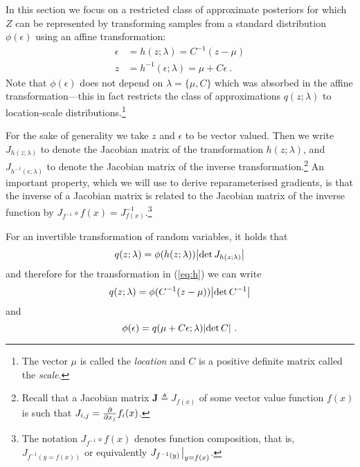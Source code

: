 \documentclass[a4paper,11pt]{article}
\begin{document}
In this section we focus on a restricted class of approximate posteriors for which $Z$ can be represented by transforming samples from a standard distribution $\phi(\epsilon)$ using an affine transformation:
\begin{subequations}\label{eq:h}
\begin{align}
\epsilon &= h(z; \lambda) = C^{-1} (z - \mu)  \\
z &= h^{-1}(\epsilon; \lambda) = \mu + C\epsilon ~ .
\end{align}
\end{subequations}
Note that $\phi(\epsilon)$ does not depend on $\lambda = \{\mu, C\}$ which was absorbed in the affine transformation---this in fact restricts the class of approximations $q(z; \lambda)$ to location-scale distributions.\footnote{The vector $\mu$ is called the \emph{location} and $C$ is a positive definite matrix called the \emph{scale}.}

For the sake of generality we take $z$ and $\epsilon$ to be vector valued. 
Then we write $J_{h(z; \lambda)}$ to denote the Jacobian matrix of the transformation $h(z; \lambda)$, and $J_{h^{-1}(\epsilon; \lambda)}$ to denote the Jacobian matrix of the inverse transformation.\footnote{Recall that a Jacobian matrix $\mathbf J \triangleq J_{f(x)}$ of some vector value function $f(x)$ is such that $J_{i,j} = \pdv{x_j} f_i(x)$.} 
An important property, which we will use to derive reparameterised gradients, is that the inverse of a Jacobian matrix is related to the Jacobian matrix of the inverse function by $J_{f^{-1}} \circ f(x)= J^{-1}_{f(x)}$.\footnote{The notation $J_{f^{-1}} \circ f(x)$ denotes function composition, that is, $J_{f^{-1}(y=f(x))}$ or equivalently $J_{f^{-1}(y)}\evaluated_{y=f(x)}$.}

For an invertible transformation of random variables, it holds that 
\begin{equation}\label{eq:change-to-phi}
q(z;\lambda) = \phi(h(z; \lambda))\abs{\det J_{h(z; \lambda)}}
\end{equation}
and therefore for the transformation in (\ref{eq:h}) we can write
\begin{equation}
q(z;\lambda) = \phi(C^{-1}(z - \mu))\abs{\det C^{-1}} 
\end{equation}
and
\begin{equation}
\phi(\epsilon) = q(\mu + C\epsilon; \lambda)\abs{\det C} ~ .
\end{equation}
\end{document}
